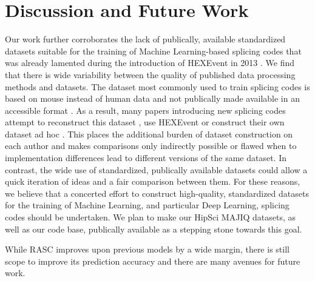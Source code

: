 \section{Discussion and Future Work}
Our work further corroborates 
the lack of publically, available standardized datasets suitable for the training of Machine Learning-based splicing codes that was already lamented during the introduction of HEXEvent in 2013 \cite{hexevent}. We find that there is wide variability between the quality of published data processing methods and datasets.
The dataset most commonly used to train splicing codes is based on mouse instead of human data and not publically made available in an accessible format \cite{jha}. As a result, many papers introducing new splicing codes attempt to reconstruct this dataset \cite{d2vsplicing}, use HEXEvent \cite{dsc} or construct their own dataset ad hoc \cite{cossmo}. This places the additional burden of dataset construction on each author and makes comparisons only indirectly possible or flawed when to implementation differences lead to different versions of the same dataset. %
In contrast, the wide use of standardized, publically available datasets could allow a quick iteration of ideas and a fair comparison between them. 
For these reasons, we believe that a concerted effort to construct high-quality, standardized datasets for the training of Machine Learning, and particular Deep Learning, splicing codes should be undertaken. We plan to make our HipSci MAJIQ datasets, as well as our code base, publically available as a stepping stone towards this goal.


While RASC improves upon previous models by a wide margin, there is still scope to improve its prediction accuracy and there are many avenues for future work. 

